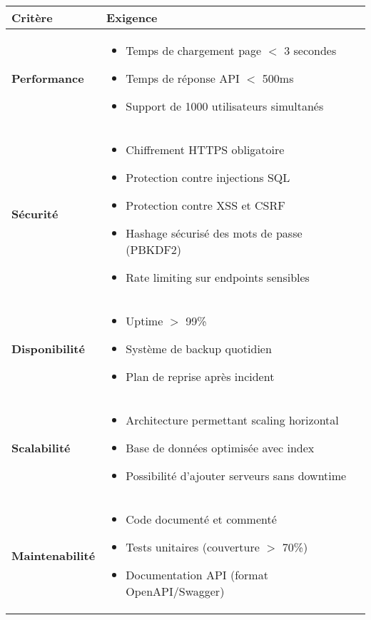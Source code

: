 \documentclass[12pt,a4paper]{report}
\begin{document}
\begin{table}[H]
\centering
\begin{tabular}{|p{2.5cm}|p{10cm}|}
\hline
\textbf{Critère} & \textbf{Exigence} \\
\hline
\textbf{Performance} &
\begin{itemize}[leftmargin=*,noitemsep]
    \item Temps de chargement page $<$ 3 secondes
    \item Temps de réponse API $<$ 500ms
    \item Support de 1000 utilisateurs simultanés
\end{itemize} \\
\hline
\textbf{Sécurité} &
\begin{itemize}[leftmargin=*,noitemsep]
    \item Chiffrement HTTPS obligatoire
    \item Protection contre injections SQL
    \item Protection contre XSS et CSRF
    \item Hashage sécurisé des mots de passe (PBKDF2)
    \item Rate limiting sur endpoints sensibles
\end{itemize} \\
\hline
\textbf{Disponibilité} &
\begin{itemize}[leftmargin=*,noitemsep]
    \item Uptime $>$ 99\%
    \item Système de backup quotidien
    \item Plan de reprise après incident
\end{itemize} \\
\hline
\textbf{Scalabilité} &
\begin{itemize}[leftmargin=*,noitemsep]
    \item Architecture permettant scaling horizontal
    \item Base de données optimisée avec index
    \item Possibilité d'ajouter serveurs sans downtime
\end{itemize} \\
\hline
\textbf{Maintenabilité} &
\begin{itemize}[leftmargin=*,noitemsep]
    \item Code documenté et commenté
    \item Tests unitaires (couverture $>$ 70\%)
    \item Documentation API (format OpenAPI/Swagger)

\end{itemize}
\end{tabular}
\end{table}
\end{document}
